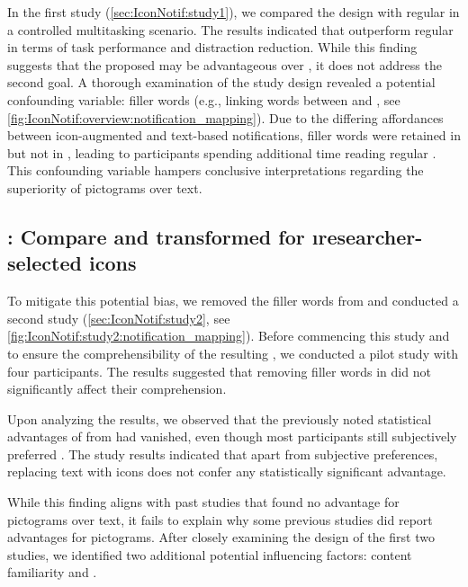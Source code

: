 In the first study (\autoref{sec:IconNotif:study1}), we compared the  design with regular \textnotif{} in a controlled multitasking scenario.
The results indicated that  outperform regular  in terms of task performance and distraction reduction. While this finding suggests that the proposed  may be advantageous over , it does not address the second goal. A thorough examination of the study design revealed a potential confounding variable: filler words (e.g., linking words between \primaryinfo{} and \secondaryinfo{}, see \autoref{fig:IconNotif:overview:notification_mapping}). Due to the differing affordances between icon-augmented and text-based notifications, filler words were retained in  but not in , leading to participants spending additional time reading regular . This confounding variable hampers conclusive interpretations regarding the superiority of pictograms over text.


\subsection{\Studytwo{}: Compare  and transformed  for \i{researcher-selected} icons}

To mitigate this potential bias, we removed the filler words from  and conducted a second study (\autoref{sec:IconNotif:study2}, see \autoref{fig:IconNotif:study2:notification_mapping}). Before commencing this study and to ensure the comprehensibility of the resulting , we conducted a pilot study with four participants. The results suggested that removing filler words in  did not significantly affect their comprehension.

Upon analyzing the \studytwo{} results, we observed that the previously noted statistical advantages of  from \studyone{} had vanished, even though most participants still subjectively preferred . The study results indicated that apart from subjective preferences, replacing text with icons does not confer any statistically significant advantage.

While this finding aligns with past studies that found no advantage for pictograms over text, it fails to explain why some previous studies did report advantages for pictograms. After closely examining the design of the first two studies, we identified two additional potential influencing factors: content familiarity and \encodingcomplexity{}.

